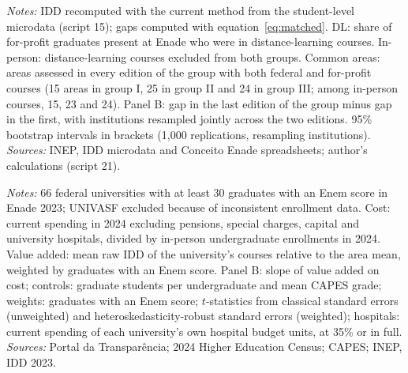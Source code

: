 \documentclass[12pt,letterpaper]{article}
\begin{document}
\begin{table}[!htbp]
\centering\small
\caption{Federal minus private for-profit value-added gap by edition: all courses, in-person courses only and areas common to every edition of each group}\label{tab:inperson}
\resizebox{\linewidth}{!}{}
\begin{minipage}{\linewidth}\vspace{0.4em}\scriptsize
\textit{Notes:} IDD recomputed with the current method from the student-level microdata (script 15); gaps computed with equation~\eqref{eq:matched}. DL: share of for-profit graduates present at Enade who were in distance-learning courses. In-person: distance-learning courses excluded from both groups. Common areas: areas assessed in every edition of the group with both federal and for-profit courses (15 areas in group I, 25 in group II and 24 in group III; among in-person courses, 15, 23 and 24). Panel B: gap in the last edition of the group minus gap in the first, with institutions resampled jointly across the two editions. 95\% bootstrap intervals in brackets (1,000 replications, resampling institutions). \textit{Sources:} INEP, IDD microdata and Conceito Enade spreadsheets; author's calculations (script 21).
\end{minipage}
\end{table}

\begin{table}[!htbp]
\centering\small
\caption{Cost per student and value added, federal universities}\label{tab:cost}
\resizebox{\linewidth}{!}{}
\begin{minipage}{\linewidth}\vspace{0.4em}\scriptsize
\textit{Notes:} 66 federal universities with at least 30 graduates with an Enem score in Enade 2023; UNIVASF excluded because of inconsistent enrollment data. Cost: current spending in 2024 excluding pensions, special charges, capital and university hospitals, divided by in-person undergraduate enrollments in 2024. Value added: mean raw IDD of the university's courses relative to the area mean, weighted by graduates with an Enem score. Panel B: slope of value added on cost; controls: graduate students per undergraduate and mean CAPES grade; weights: graduates with an Enem score; $t$-statistics from classical standard errors (unweighted) and heteroskedasticity-robust standard errors (weighted); hospitals: current spending of each university's own hospital budget units, at 35\% or in full. \textit{Sources:} Portal da Transpar\^encia; 2024 Higher Education Census; CAPES; INEP, IDD 2023.
\end{minipage}
\end{table}
\end{document}
